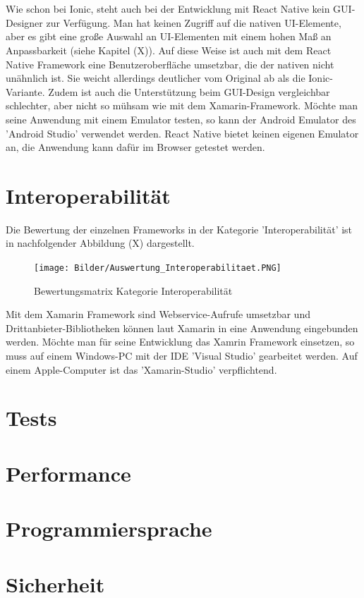 \\
\\
Wie schon bei Ionic, steht auch bei der Entwicklung mit React Native kein GUI-Designer zur Verfügung. Man hat keinen Zugriff auf die nativen UI-Elemente, aber es gibt eine große Auswahl an UI-Elementen mit einem hohen Maß an Anpassbarkeit (siehe Kapitel (X)). Auf diese Weise ist auch mit dem React Native Framework eine Benutzeroberfläche umsetzbar, die der nativen nicht unähnlich ist. Sie weicht allerdings deutlicher vom Original ab als die Ionic-Variante. Zudem ist auch die Unterstützung beim GUI-Design vergleichbar schlechter, aber nicht so mühsam wie mit dem Xamarin-Framework. Möchte man seine Anwendung mit einem Emulator testen, so kann der Android Emulator des 'Android Studio' verwendet werden. React Native bietet keinen eigenen Emulator an, die Anwendung kann dafür im Browser getestet werden. 

\section{Interoperabilität}

Die Bewertung der einzelnen Frameworks in der Kategorie 'Interoperabilität' ist in nachfolgender Abbildung (X) dargestellt.

\begin{figure}[h]
	\centering
	\texttt{[image: Bilder/Auswertung\_Interoperabilitaet.PNG]}
	\caption{Bewertungsmatrix Kategorie Interoperabilität}
	\label{fig:AuswInterop}
\end{figure}

Mit dem Xamarin Framework sind Webservice-Aufrufe umsetzbar und Drittanbieter-Bibliotheken können laut Xamarin in eine Anwendung eingebunden werden. Möchte man für seine Entwicklung das Xamrin Framework einsetzen, so muss auf einem Windows-PC mit der IDE 'Visual Studio' gearbeitet werden. Auf einem Apple-Computer ist das 'Xamarin-Studio' verpflichtend. 

\section{Tests}

\section{Performance}

\section{Programmiersprache}

\section{Sicherheit}
